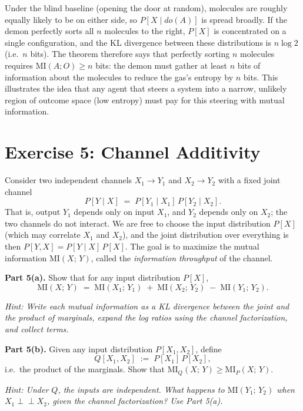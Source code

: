 \documentclass[8pt]{article}
\begin{document}
\medskip
\noindent
Under the blind baseline (opening the door at random), molecules are roughly equally
likely to be on either side, so $P[X \mid do(A)]$ is spread broadly. If the demon
perfectly sorts all $n$ molecules to the right, $P[X]$ is concentrated on a single
configuration, and the KL divergence between these distributions is $n \log 2$ (i.e.\
$n$ bits). The theorem therefore says that perfectly sorting $n$ molecules requires
$\mathrm{MI}(A; O) \geq n$ bits: the demon must gather at least $n$ bits of
information about the molecules to reduce the gas's entropy by $n$ bits.
This illustrates the idea that any agent that steers a system into a narrow, unlikely region of outcome space (low entropy) must pay for this steering with mutual information. 


\section{Exercise 5: Channel Additivity}

\noindent
Consider two independent channels $X_1 \to Y_1$ and $X_2 \to Y_2$ with a fixed
joint channel
\[
  P[Y \mid X] \;=\; P[Y_1 \mid X_1]\, P[Y_2 \mid X_2].
\]
That is, output $Y_1$ depends only on input $X_1$, and $Y_2$ depends only on $X_2$;
the two channels do not interact. We are free to choose the input distribution $P[X]$
(which may correlate $X_1$ and $X_2$), and the joint distribution over everything is
then $P[Y, X] = P[Y \mid X]\, P[X]$. The goal is to maximize the mutual information
$\mathrm{MI}(X;\, Y)$, called the \emph{information throughput} of the channel.

\medskip
\noindent
\textbf{Part 5(a).} Show that for any input distribution $P[X]$,
\[
  \mathrm{MI}(X;\, Y) \;=\;
  \mathrm{MI}(X_1;\, Y_1) \;+\; \mathrm{MI}(X_2;\, Y_2) \;-\;
  \mathrm{MI}(Y_1;\, Y_2).
\]

\medskip
\noindent
\emph{Hint: Write each mutual information as a KL divergence between the joint and
the product of marginals, expand the log ratios using the channel factorization, and
collect terms.}

\medskip
\noindent
\textbf{Part 5(b).} Given any input distribution $P[X_1, X_2]$, define
\[
  Q[X_1, X_2] \;:=\; P[X_1]\, P[X_2],
\]
i.e.\ the product of the marginals. Show that
$\mathrm{MI}_Q(X;\, Y) \geq \mathrm{MI}_P(X;\, Y)$.

\medskip
\noindent
\emph{Hint: Under $Q$, the inputs are independent. What happens to
$\mathrm{MI}(Y_1;\, Y_2)$ when $X_1 \perp\!\!\!\perp X_2$, given the channel
factorization? Use Part 5(a).}
\end{document}
